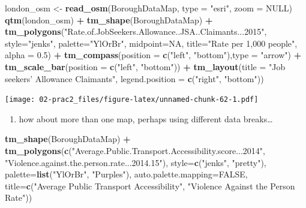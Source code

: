 \documentclass[]{book}
\newenvironment{Shaded}{\begin{snugshade}}{\end{snugshade}}
\newcommand{\DataTypeTok}[1]{\textcolor[rgb]{0.13,0.29,0.53}{#1}}
\newcommand{\FloatTok}[1]{\textcolor[rgb]{0.00,0.00,0.81}{#1}}
\newcommand{\KeywordTok}[1]{\textcolor[rgb]{0.13,0.29,0.53}{\textbf{#1}}}
\newcommand{\NormalTok}[1]{#1}
\newcommand{\OperatorTok}[1]{\textcolor[rgb]{0.81,0.36,0.00}{\textbf{#1}}}
\newcommand{\OtherTok}[1]{\textcolor[rgb]{0.56,0.35,0.01}{#1}}
\newcommand{\StringTok}[1]{\textcolor[rgb]{0.31,0.60,0.02}{#1}}
\providecommand{\tightlist}{%
  \setlength{\itemsep}{0pt}\setlength{\parskip}{0pt}}
\begin{document}
\begin{Shaded}
\begin{Highlighting}[]
\NormalTok{london_osm <-}\StringTok{ }\KeywordTok{read_osm}\NormalTok{(BoroughDataMap, }\DataTypeTok{type =} \StringTok{"esri"}\NormalTok{, }\DataTypeTok{zoom =} \OtherTok{NULL}\NormalTok{)}
\KeywordTok{qtm}\NormalTok{(london_osm) }\OperatorTok{+}\StringTok{ }
\StringTok{  }\KeywordTok{tm_shape}\NormalTok{(BoroughDataMap) }\OperatorTok{+}\StringTok{ }
\StringTok{  }\KeywordTok{tm_polygons}\NormalTok{(}\StringTok{"Rate.of.JobSeekers.Allowance..JSA..Claimants...2015"}\NormalTok{, }
        \DataTypeTok{style=}\StringTok{"jenks"}\NormalTok{,}
        \DataTypeTok{palette=}\StringTok{"YlOrBr"}\NormalTok{,}
        \DataTypeTok{midpoint=}\OtherTok{NA}\NormalTok{,}
        \DataTypeTok{title=}\StringTok{"Rate per 1,000 people"}\NormalTok{,}
        \DataTypeTok{alpha =} \FloatTok{0.5}\NormalTok{) }\OperatorTok{+}\StringTok{ }
\StringTok{  }\KeywordTok{tm_compass}\NormalTok{(}\DataTypeTok{position =} \KeywordTok{c}\NormalTok{(}\StringTok{"left"}\NormalTok{, }\StringTok{"bottom"}\NormalTok{),}\DataTypeTok{type =} \StringTok{"arrow"}\NormalTok{) }\OperatorTok{+}\StringTok{ }
\StringTok{  }\KeywordTok{tm_scale_bar}\NormalTok{(}\DataTypeTok{position =} \KeywordTok{c}\NormalTok{(}\StringTok{"left"}\NormalTok{, }\StringTok{"bottom"}\NormalTok{)) }\OperatorTok{+}
\StringTok{  }\KeywordTok{tm_layout}\NormalTok{(}\DataTypeTok{title =} \StringTok{"Job seekers' Allowance Claimants"}\NormalTok{, }\DataTypeTok{legend.position =} \KeywordTok{c}\NormalTok{(}\StringTok{"right"}\NormalTok{, }\StringTok{"bottom"}\NormalTok{))}
\end{Highlighting}
\end{Shaded}

\texttt{[image: 02-prac2\_files/figure-latex/unnamed-chunk-62-1.pdf]}

\begin{enumerate}
\def\labelenumi{\arabic{enumi}.}
\setcounter{enumi}{11}
\tightlist
\item
  how about more than one map, perhaps using different data breaks\ldots{}
\end{enumerate}

\begin{Shaded}
\begin{Highlighting}[]
\KeywordTok{tm_shape}\NormalTok{(BoroughDataMap) }\OperatorTok{+}
\StringTok{    }\KeywordTok{tm_polygons}\NormalTok{(}\KeywordTok{c}\NormalTok{(}\StringTok{"Average.Public.Transport.Accessibility.score...2014"}\NormalTok{, }\StringTok{"Violence.against.the.person.rate...2014.15"}\NormalTok{), }
        \DataTypeTok{style=}\KeywordTok{c}\NormalTok{(}\StringTok{"jenks"}\NormalTok{, }\StringTok{"pretty"}\NormalTok{),}
        \DataTypeTok{palette=}\KeywordTok{list}\NormalTok{(}\StringTok{"YlOrBr"}\NormalTok{, }\StringTok{"Purples"}\NormalTok{),}
        \DataTypeTok{auto.palette.mapping=}\OtherTok{FALSE}\NormalTok{,}
        \DataTypeTok{title=}\KeywordTok{c}\NormalTok{(}\StringTok{"Average Public Transport Accessibility"}\NormalTok{, }\StringTok{"Violence Against the Person Rate"}\NormalTok{))}
\end{Highlighting}
\end{Shaded}
\end{document}
